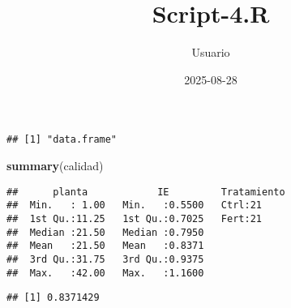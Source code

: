 \documentclass[
]{article}
\title{Script-4.R}
\author{Usuario}
\date{2025-08-28}
\newenvironment{Shaded}{\begin{snugshade}}{\end{snugshade}}
\newcommand{\AttributeTok}[1]{\textcolor[rgb]{0.13,0.29,0.53}{#1}}
\newcommand{\CommentTok}[1]{\textcolor[rgb]{0.56,0.35,0.01}{\textit{#1}}}
\newcommand{\ConstantTok}[1]{\textcolor[rgb]{0.56,0.35,0.01}{#1}}
\newcommand{\FunctionTok}[1]{\textcolor[rgb]{0.13,0.29,0.53}{\textbf{#1}}}
\newcommand{\NormalTok}[1]{#1}
\newcommand{\OtherTok}[1]{\textcolor[rgb]{0.56,0.35,0.01}{#1}}
\newcommand{\SpecialCharTok}[1]{\textcolor[rgb]{0.81,0.36,0.00}{\textbf{#1}}}
\newcommand{\StringTok}[1]{\textcolor[rgb]{0.31,0.60,0.02}{#1}}
\begin{document}
\maketitle

\begin{Shaded}
\end{Shaded}

\begin{verbatim}
## [1] "data.frame"
\end{verbatim}

\begin{Shaded}
\begin{Highlighting}[]
\FunctionTok{summary}\NormalTok{(calidad)}
\end{Highlighting}
\end{Shaded}

\begin{verbatim}
##      planta            IE         Tratamiento
##  Min.   : 1.00   Min.   :0.5500   Ctrl:21    
##  1st Qu.:11.25   1st Qu.:0.7025   Fert:21    
##  Median :21.50   Median :0.7950              
##  Mean   :21.50   Mean   :0.8371              
##  3rd Qu.:31.75   3rd Qu.:0.9375              
##  Max.   :42.00   Max.   :1.1600
\end{verbatim}

\begin{Shaded}
\end{Shaded}

\begin{verbatim}
## [1] 0.8371429
\end{verbatim}
\end{document}
